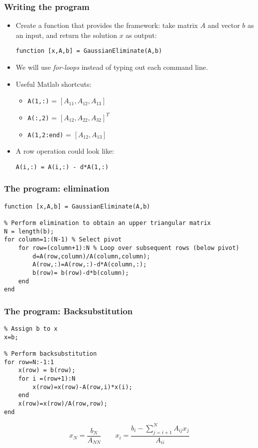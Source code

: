 \begin{frame}[fragile]
  \frametitle{Writing the program}
  \begin{itemize}
   \item Create a function that provides the framework: take matrix $A$ and vector $b$ as an input, and return the solution $x$ as output:
  \begin{lstlisting}
function [x,A,b] = GaussianEliminate(A,b)
  \end{lstlisting}
  \item We will use \emph{for-loops} instead of typing out each command line.
  \item Useful Matlab shortcuts:
  \begin{itemize}
  \item \lstinline$A(1,:)$   = $[A_{11}, A_{12}, A_{13}]$
  \item \lstinline$A(:,2)$   = $[A_{12}, A_{22}, A_{32}]^T$
  \item \lstinline$A(1,2:end)$ = $[A_{12}, A_{13}]$
  \end{itemize}
  \item A row operation could look like:
  \begin{lstlisting}
A(i,:) = A(i,:) - d*A(1,:)   
  \end{lstlisting}
  \end{itemize}
\end{frame}

\begin{frame}[fragile]
  \frametitle{The program: elimination}
  \begin{lstlisting}
function [x,A,b] = GaussianEliminate(A,b)

% Perform elimination to obtain an upper triangular matrix
N = length(b);
for column=1:(N-1) % Select pivot
    for row=(column+1):N % Loop over subsequent rows (below pivot)
        d=A(row,column)/A(column,column);
        A(row,:)=A(row,:)-d*A(column,:);
        b(row)= b(row)-d*b(column);
    end
end
  \end{lstlisting}
\end{frame}

\begin{frame}[fragile]
  \frametitle{The program: Backsubstitution}
  \begin{lstlisting}
% Assign b to x
x=b;

% Perform backsubstitution
for row=N:-1:1
    x(row) = b(row);
    for i =(row+1):N
        x(row)=x(row)-A(row,i)*x(i);
    end
    x(row)=x(row)/A(row,row);
end
  \end{lstlisting}
  \[
     x_N = \frac{b_N}{A_{NN}} \qquad x_i = \frac{b_i - \sum_{j=i+1}^{N}A_{ij}x_j}{A_{ii}}
  \]
\end{frame}

